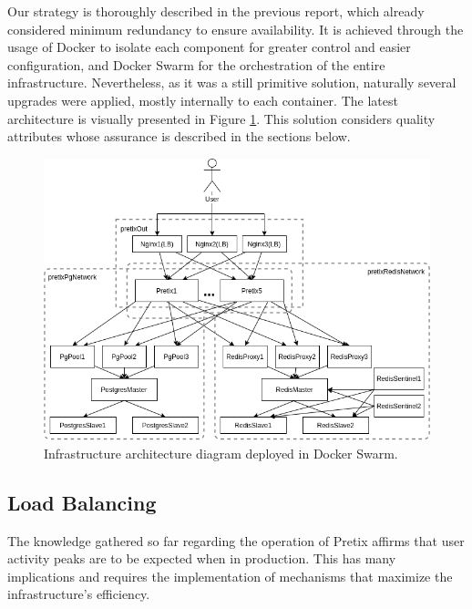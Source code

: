 \documentclass[12pt]{article}
\begin{document}
Our strategy is thoroughly described in the previous report, which already considered minimum redundancy to ensure availability.
It is achieved through the usage of Docker to isolate each component for greater control and easier configuration, and Docker Swarm for the orchestration of 
the entire infrastructure.
Nevertheless, as it was a still primitive solution, naturally several upgrades were applied, mostly internally to each container.
The latest architecture is visually presented in Figure \ref{fig:InfrastructureArchitecture}.
This solution considers quality attributes whose assurance is described in the sections below.

\begin{figure}[H]
 \centering
 \begin{minipage}{.85\textwidth}
   \centering
   \includegraphics[width=\linewidth]{diagrams/InfrastructureArchitecture.png}
 \end{minipage}%
 \caption{Infrastructure architecture diagram deployed in Docker Swarm.}
 \label{fig:InfrastructureArchitecture}
\end{figure}

\subsection{Load Balancing} \label{architecture.loadbalancing} %


The knowledge gathered so far regarding the operation of Pretix affirms that user activity peaks are to be expected when in production.
This has many implications and requires the implementation of mechanisms that maximize the infrastructure's efficiency.
\end{document}
